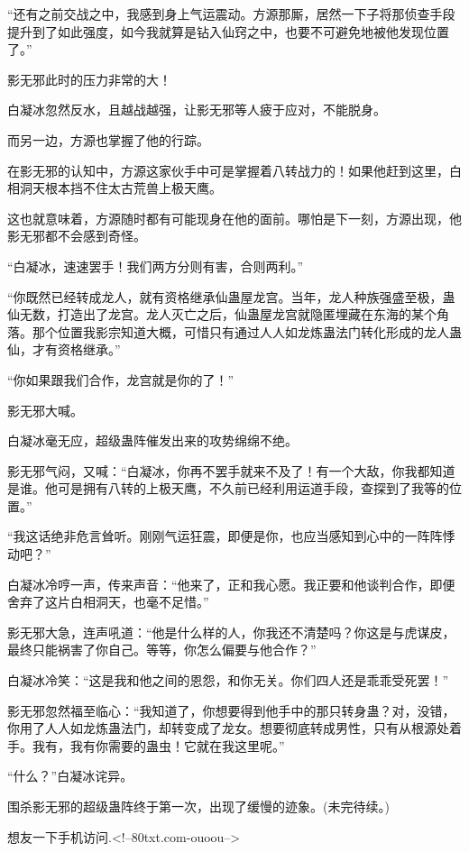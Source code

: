 \begin{this_body}
“还有之前交战之中，我感到身上气运震动。方源那厮，居然一下子将那侦查手段提升到了如此强度，如今我就算是钻入仙窍之中，也要不可避免地被他发现位置了。”

影无邪此时的压力非常的大！

白凝冰忽然反水，且越战越强，让影无邪等人疲于应对，不能脱身。

而另一边，方源也掌握了他的行踪。

在影无邪的认知中，方源这家伙手中可是掌握着八转战力的！如果他赶到这里，白相洞天根本挡不住太古荒兽上极天鹰。

这也就意味着，方源随时都有可能现身在他的面前。哪怕是下一刻，方源出现，他影无邪都不会感到奇怪。

“白凝冰，速速罢手！我们两方分则有害，合则两利。”

“你既然已经转成龙人，就有资格继承仙蛊屋龙宫。当年，龙人种族强盛至极，蛊仙无数，打造出了龙宫。龙人灭亡之后，仙蛊屋龙宫就隐匿埋藏在东海的某个角落。那个位置我影宗知道大概，可惜只有通过人人如龙炼蛊法门转化形成的龙人蛊仙，才有资格继承。”

“你如果跟我们合作，龙宫就是你的了！”

影无邪大喊。

白凝冰毫无应，超级蛊阵催发出来的攻势绵绵不绝。

影无邪气闷，又喊：“白凝冰，你再不罢手就来不及了！有一个大敌，你我都知道是谁。他可是拥有八转的上极天鹰，不久前已经利用运道手段，查探到了我等的位置。”

“我这话绝非危言耸听。刚刚气运狂震，即便是你，也应当感知到心中的一阵阵悸动吧？”

白凝冰冷哼一声，传来声音：“他来了，正和我心愿。我正要和他谈判合作，即便舍弃了这片白相洞天，也毫不足惜。”

影无邪大急，连声吼道：“他是什么样的人，你我还不清楚吗？你这是与虎谋皮，最终只能祸害了你自己。等等，你怎么偏要与他合作？”

白凝冰冷笑：“这是我和他之间的恩怨，和你无关。你们四人还是乖乖受死罢！”

影无邪忽然福至临心：“我知道了，你想要得到他手中的那只转身蛊？对，没错，你用了人人如龙炼蛊法门，却转变成了龙女。想要彻底转成男性，只有从根源处着手。我有，我有你需要的蛊虫！它就在我这里呢。”

“什么？”白凝冰诧异。

围杀影无邪的超级蛊阵终于第一次，出现了缓慢的迹象。(未完待续。)

想友一下手机访问.<!--80txt.com-ouoou-->

\end{this_body}

